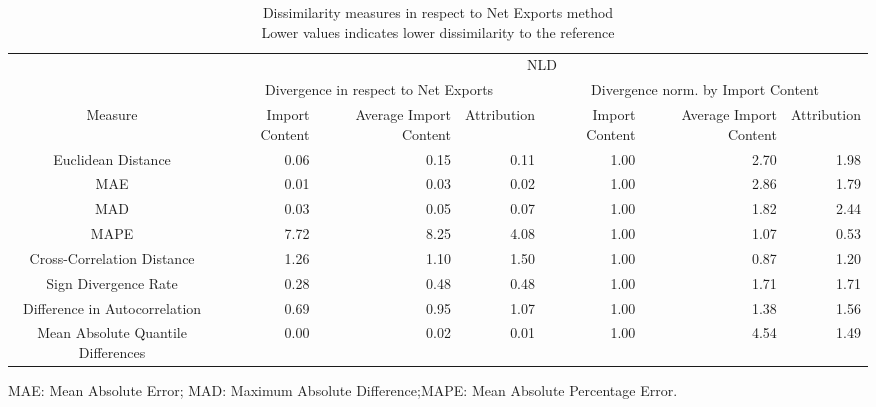 \begin{table}[t]
\caption*{
{\large Dissimilarity measures in respect to Net Exports method} \\ 
{\small Lower values indicates lower dissimilarity to the reference}
} 
\fontsize{15.0pt}{18.0pt}\selectfont
\begin{tabular*}{\linewidth}{@{\extracolsep{\fill}}crrrrrr}
\toprule
 & \multicolumn{6}{c}{NLD} \\ 
\cmidrule(lr){2-7}
 & \multicolumn{3}{c}{Divergence in respect to Net Exports} & \multicolumn{3}{c}{Divergence norm. by Import Content} \\ 
\cmidrule(lr){2-4} \cmidrule(lr){5-7}
Measure & Import Content & Average Import Content & Attribution & Import Content & Average Import Content & Attribution \\ 
\midrule\addlinespace[2.5pt]
Euclidean Distance & 0.06 & 0.15 & 0.11 & 1.00 & 2.70 & 1.98 \\ 
MAE & 0.01 & 0.03 & 0.02 & 1.00 & 2.86 & 1.79 \\ 
MAD & 0.03 & 0.05 & 0.07 & 1.00 & 1.82 & 2.44 \\ 
MAPE & 7.72 & 8.25 & 4.08 & 1.00 & 1.07 & 0.53 \\ 
Cross-Correlation Distance & 1.26 & 1.10 & 1.50 & 1.00 & 0.87 & 1.20 \\ 
Sign Divergence Rate & 0.28 & 0.48 & 0.48 & 1.00 & 1.71 & 1.71 \\ 
Difference in Autocorrelation & 0.69 & 0.95 & 1.07 & 1.00 & 1.38 & 1.56 \\ 
Mean Absolute Quantile Differences & 0.00 & 0.02 & 0.01 & 1.00 & 4.54 & 1.49 \\ 
\bottomrule
\end{tabular*}
\begin{minipage}{\linewidth}
MAE: Mean Absolute Error; MAD: Maximum Absolute Difference;MAPE: Mean Absolute Percentage Error.\\
\end{minipage}
\end{table}

